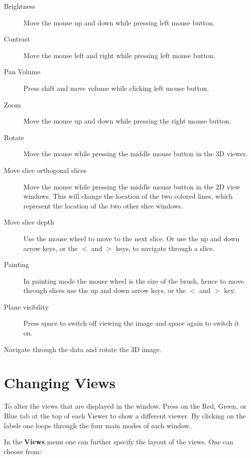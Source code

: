 \documentclass[fleqn,11pt,openany]{book}
\begin{document}
\begin{description}
\item[Brightness] Move the mouse up and down while pressing left mouse button.

\item[Contrast] Move the mouse left and right while pressing left mouse button.

\item[Pan Volume] Press shift and move volume while clicking left mouse button.

\item[Zoom] Move the mouse up and down while pressing the right mouse button.

\item[Rotate] Move the mouse while pressing the middle mouse button in the 3D viewer.

\item[Move slice orthogonal slices] Move the mouse while pressing the middle mouse button in the 2D view windows. This will change the location of the two colored lines, which represent the location of the two other slice windows. 

\item[Move slice depth] Use the mouse wheel to move to the next slice. Or use the up and down arrow keys, or the {\bf $<$} and {\bf $>$} keys, to navigate through a slice.

\item[Painting] In painting mode the mouse wheel is the size of the brush, hence to move through slices use the up and down arrow keys, or the  {\bf $<$} and {\bf  $>$} key. 

\item[Plane visibility] Press space to switch off viewing the image and space again to switch it on.
 
\end{description}

Navigate through the data and rotate the 3D image.

\section{Changing Views}

To alter the views that are displayed in the window. Press on the Red, Green, or Blue tab at the top of each Viewer to show a different viewer. By clicking on the labels one loops through the four main modes of each window.

In the {\bf Views} menu one can further specify the layout of the views. One can choose from:
\end{document}
